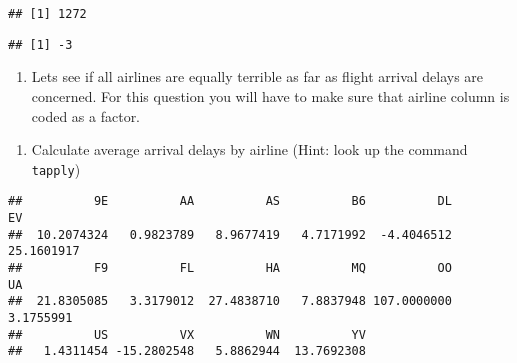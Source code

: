 \documentclass[]{article}
\newenvironment{Shaded}{\begin{snugshade}}{\end{snugshade}}
\newcommand{\KeywordTok}[1]{\textcolor[rgb]{0.13,0.29,0.53}{\textbf{#1}}}
\newcommand{\DataTypeTok}[1]{\textcolor[rgb]{0.13,0.29,0.53}{#1}}
\newcommand{\StringTok}[1]{\textcolor[rgb]{0.31,0.60,0.02}{#1}}
\newcommand{\CommentTok}[1]{\textcolor[rgb]{0.56,0.35,0.01}{\textit{#1}}}
\newcommand{\OtherTok}[1]{\textcolor[rgb]{0.56,0.35,0.01}{#1}}
\newcommand{\OperatorTok}[1]{\textcolor[rgb]{0.81,0.36,0.00}{\textbf{#1}}}
\newcommand{\NormalTok}[1]{#1}
\providecommand{\tightlist}{%
  \setlength{\itemsep}{0pt}\setlength{\parskip}{0pt}}
\begin{document}
\begin{verbatim}
## [1] 1272
\end{verbatim}

\begin{Shaded}
\end{Shaded}

\begin{verbatim}
## [1] -3
\end{verbatim}

\begin{enumerate}
\def\labelenumi{\arabic{enumi}.}
\setcounter{enumi}{2}
\tightlist
\item
  Lets see if all airlines are equally terrible as far as flight arrival
  delays are concerned. For this question you will have to make sure
  that airline column is coded as a factor.
\end{enumerate}

\begin{Shaded}
\end{Shaded}

\begin{enumerate}
\def\labelenumi{\alph{enumi})}
\tightlist
\item
  Calculate average arrival delays by airline (Hint: look up the command
  \texttt{tapply})
\end{enumerate}

\begin{Shaded}
\end{Shaded}

\begin{verbatim}
##          9E          AA          AS          B6          DL          EV 
##  10.2074324   0.9823789   8.9677419   4.7171992  -4.4046512  25.1601917 
##          F9          FL          HA          MQ          OO          UA 
##  21.8305085   3.3179012  27.4838710   7.8837948 107.0000000   3.1755991 
##          US          VX          WN          YV 
##   1.4311454 -15.2802548   5.8862944  13.7692308
\end{verbatim}
\end{document}
